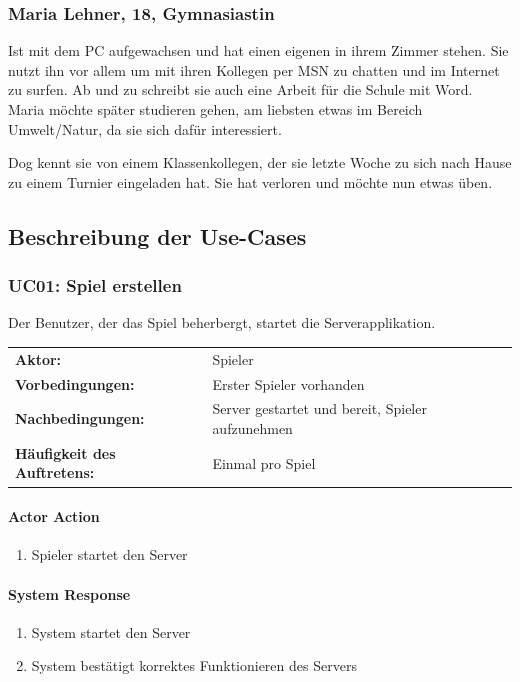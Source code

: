 \documentclass[12pt,halfparskip]{scrartcl}
\begin{document}
\subsubsection{Maria Lehner, 18, Gymnasiastin}\label{sub:maria_lehner} 

Ist mit dem PC aufgewachsen und hat einen eigenen in ihrem Zimmer stehen. Sie nutzt ihn vor allem um mit ihren Kollegen per MSN zu chatten und im Internet zu surfen. Ab und zu schreibt sie auch eine Arbeit für die Schule mit Word. Maria möchte später studieren gehen, am liebsten etwas im Bereich Umwelt/Natur, da sie sich dafür interessiert. 

Dog kennt sie von einem Klassenkollegen, der sie letzte Woche zu sich nach Hause zu einem Turnier eingeladen hat. Sie hat verloren und möchte nun etwas üben.

\subsection{Beschreibung der Use-Cases}\label{sub:use_cases}
\subsubsection{UC01: Spiel erstellen}\label{ssub:uc01_spiel_erstellen}
Der Benutzer, der das Spiel beherbergt, startet die Serverapplikation.

\begin{tabular}{@{} l l @{}}
	\textbf{Aktor:}											&	Spieler \\
	\textbf{Vorbedingungen:}						& Erster Spieler vorhanden \\
	\textbf{Nachbedingungen:}						& Server gestartet und bereit, Spieler aufzunehmen \\
	\textbf{Häufigkeit des Auftretens:}	& Einmal pro Spiel \\
\end{tabular}

\vspace{0.5cm}

\begin{multicols}{2}
\raggedcolumns
\paragraph{Actor Action}
\begin{enumerate}
	\item[1] Spieler startet den Server
\end{enumerate}
\columnbreak
\paragraph{System Response}
\begin{enumerate}
	\item[2] System startet den Server
	\item[3] System bestätigt korrektes Funktionieren des Servers
\end{enumerate}
\end{multicols}
\end{document}
